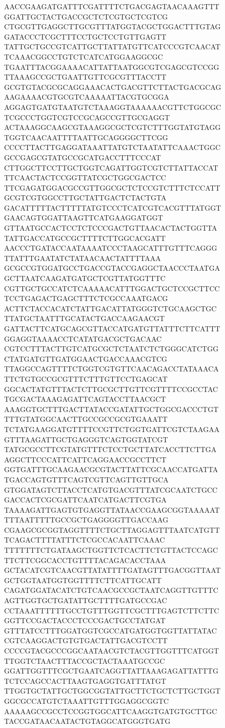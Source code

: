 \begin{figure}
\begin{dnaseq}
AACCGAAGATGATTTCGATTTTCTGACGAGTAACAAAGTTTGGATTGCTACTGACCGCTCTCGTGCTCGTCG
CTGCGTTGAGGCTTGCGTTTATGGTACGCTGGACTTTGTAGGATACCCTCGCTTTCCTGCTCCTGTTGAGTT
TATTGCTGCCGTCATTGCTTATTATGTTCATCCCGTCAACATTCAAACGGCCTGTCTCATCATGGAAGGCGC
TGAATTTACGGAAAACATTATTAATGGCGTCGAGCGTCCGGTTAAAGCCGCTGAATTGTTCGCGTTTACCTT
GCGTGTACGCGCAGGAAACACTGACGTTCTTACTGACGCAGAAGAAAACGTGCGTCAAAAATTACGTGCGGA
AGGAGTGATGTAATGTCTAAAGGTAAAAAACGTTCTGGCGCTCGCCCTGGTCGTCCGCAGCCGTTGCGAGGT
ACTAAAGGCAAGCGTAAAGGCGCTCGTCTTTGGTATGTAGGTGGTCAACAATTTTAATTGCAGGGGCTTCGG
CCCCTTACTTGAGGATAAATTATGTCTAATATTCAAACTGGCGCCGAGCGTATGCCGCATGACCTTTCCCAT
CTTGGCTTCCTTGCTGGTCAGATTGGTCGTCTTATTACCATTTCAACTACTCCGGTTATCGCTGGCGACTCC
TTCGAGATGGACGCCGTTGGCGCTCTCCGTCTTTCTCCATTGCGTCGTGGCCTTGCTATTGACTCTACTGTA
GACATTTTTACTTTTTATGTCCCTCATCGTCACGTTTATGGTGAACAGTGGATTAAGTTCATGAAGGATGGT
GTTAATGCCACTCCTCTCCCGACTGTTAACACTACTGGTTATATTGACCATGCCGCTTTTCTTGGCACGATT
AACCCTGATACCAATAAAATCCCTAAGCATTTGTTTCAGGGTTATTTGAATATCTATAACAACTATTTTAAA
GCGCCGTGGATGCCTGACCGTACCGAGGCTAACCCTAATGAGCTTAATCAAGATGATGCTCGTTATGGTTTC
CGTTGCTGCCATCTCAAAAACATTTGGACTGCTCCGCTTCCTCCTGAGACTGAGCTTTCTCGCCAAATGACG
ACTTCTACCACATCTATTGACATTATGGGTCTGCAAGCTGCTTATGCTAATTTGCATACTGACCAAGAACGT
GATTACTTCATGCAGCGTTACCATGATGTTATTTCTTCATTTGGAGGTAAAACCTCATATGACGCTGACAAC
CGTCCTTTACTTGTCATGCGCTCTAATCTCTGGGCATCTGGCTATGATGTTGATGGAACTGACCAAACGTCG
TTAGGCCAGTTTTCTGGTCGTGTTCAACAGACCTATAAACATTCTGTGCCGCGTTTCTTTGTTCCTGAGCAT
GGCACTATGTTTACTCTTGCGCTTGTTCGTTTTCCGCCTACTGCGACTAAAGAGATTCAGTACCTTAACGCT
AAAGGTGCTTTGACTTATACCGATATTGCTGGCGACCCTGTTTTGTATGGCAACTTGCCGCCGCGTGAAATT
TCTATGAAGGATGTTTTCCGTTCTGGTGATTCGTCTAAGAAGTTTAAGATTGCTGAGGGTCAGTGGTATCGT
TATGCGCCTTCGTATGTTTCTCCTGCTTATCACCTTCTTGAAGGCTTCCCATTCATTCAGGAACCGCCTTCT
GGTGATTTGCAAGAACGCGTACTTATTCGCAACCATGATTATGACCAGTGTTTCAGTCGTTCAGTTGTTGCA
GTGGATAGTCTTACCTCATGTGACGTTTATCGCAATCTGCCGACCACTCGCGATTCAATCATGACTTCGTGA
TAAAAGATTGAGTGTGAGGTTATAACCGAAGCGGTAAAAATTTTAATTTTTGCCGCTGAGGGGTTGACCAAG
CGAAGCGCGGTAGGTTTTCTGCTTAGGAGTTTAATCATGTTTCAGACTTTTATTTCTCGCCACAATTCAAAC
TTTTTTTCTGATAAGCTGGTTCTCACTTCTGTTACTCCAGCTTCTTCGGCACCTGTTTTACAGACACCTAAA
GCTACATCGTCAACGTTATATTTTGATAGTTTGACGGTTAATGCTGGTAATGGTGGTTTTCTTCATTGCATT
CAGATGGATACATCTGTCAACGCCGCTAATCAGGTTGTTTCAGTTGGTGCTGATATTGCTTTTGATGCCGAC
CCTAAATTTTTTGCCTGTTTGGTTCGCTTTGAGTCTTCTTCGGTTCCGACTACCCTCCCGACTGCCTATGAT
GTTTATCCTTTGGATGGTCGCCATGATGGTGGTTATTATACCGTCAAGGACTGTGTGACTATTGACGTCCTT
CCCCGTACGCCCGGCAATAACGTCTACGTTGGTTTCATGGTTTGGTCTAACTTTACCGCTACTAAATGCCGC
GGATTGGTTTCGCTGAATCAGGTTATTAAAGAGATTATTTGTCTCCAGCCACTTAAGTGAGGTGATTTATGT
TTGGTGCTATTGCTGGCGGTATTGCTTCTGCTCTTGCTGGTGGCGCCATGTCTAAATTGTTTGGAGGCGGTC
AAAAAGCCGCCTCCGGTGGCATTCAAGGTGATGTGCTTGCTACCGATAACAATACTGTAGGCATGGGTGATG

\end{dnaseq}
\end{figure}
